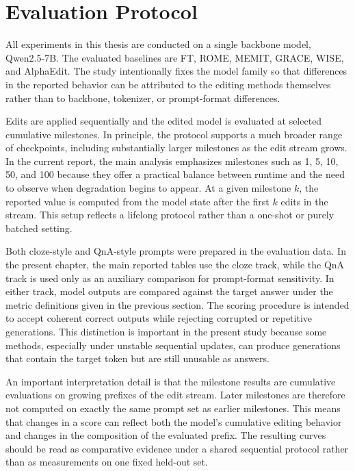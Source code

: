 \section{Evaluation Protocol}
\enlargethispage{2\baselineskip}

All experiments in this thesis are conducted on a single backbone model, Qwen2.5-7B. The evaluated baselines are FT, ROME, MEMIT, GRACE, WISE, and AlphaEdit. The study intentionally fixes the model family so that differences in the reported behavior can be attributed to the editing methods themselves rather than to backbone, tokenizer, or prompt-format differences.

Edits are applied sequentially and the edited model is evaluated at selected cumulative milestones. In principle, the protocol supports a much broader range of checkpoints, including substantially larger milestones as the edit stream grows. In the current report, the main analysis emphasizes milestones such as 1, 5, 10, 50, and 100 because they offer a practical balance between runtime and the need to observe when degradation begins to appear. At a given milestone $k$, the reported value is computed from the model state after the first $k$ edits in the stream. This setup reflects a lifelong protocol rather than a one-shot or purely batched setting.

Both cloze-style and QnA-style prompts were prepared in the evaluation data. In the present chapter, the main reported tables use the cloze track, while the QnA track is used only as an auxiliary comparison for prompt-format sensitivity. In either track, model outputs are compared against the target answer under the metric definitions given in the previous section. The scoring procedure is intended to accept coherent correct outputs while rejecting corrupted or repetitive generations. This distinction is important in the present study because some methods, especially under unstable sequential updates, can produce generations that contain the target token but are still unusable as answers.

An important interpretation detail is that the milestone results are cumulative evaluations on growing prefixes of the edit stream. Later milestones are therefore not computed on exactly the same prompt set as earlier milestones. This means that changes in a score can reflect both the model's cumulative editing behavior and changes in the composition of the evaluated prefix. The resulting curves should be read as comparative evidence under a shared sequential protocol rather than as measurements on one fixed held-out set.
